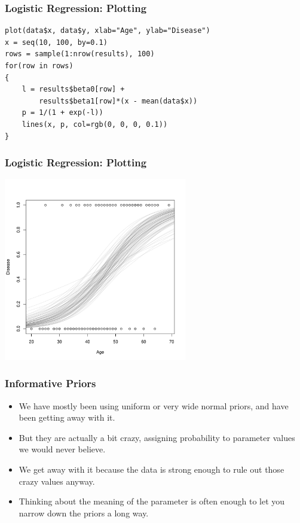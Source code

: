 \documentclass{beamer}
\begin{document}
\begin{frame}[fragile]
\frametitle{Logistic Regression: Plotting}

\begin{verbatim}
plot(data$x, data$y, xlab="Age", ylab="Disease")
x = seq(10, 100, by=0.1)
rows = sample(1:nrow(results), 100)
for(row in rows)
{
    l = results$beta0[row] +
        results$beta1[row]*(x - mean(data$x))
    p = 1/(1 + exp(-l))
    lines(x, p, col=rgb(0, 0, 0, 0.1))
}
\end{verbatim}

\end{frame}

\begin{frame}
\frametitle{Logistic Regression: Plotting}

\begin{center}
\includegraphics[width=0.6\textwidth]{images/logistic_curves.pdf}
\end{center}

\end{frame}


\begin{frame}
\frametitle{Informative Priors}

\begin{itemize}
\item We have mostly been using uniform or very wide normal priors,
and have been getting away with it.\pause
\item But they are actually a bit crazy, assigning probability to parameter
values we would never believe.\pause
\item We get away with it because the data is strong enough to rule out those
crazy values anyway.\pause
\item Thinking about the meaning of the parameter is often enough to let you
narrow down the priors a long way.
\end{itemize}

\end{frame}
\end{document}
